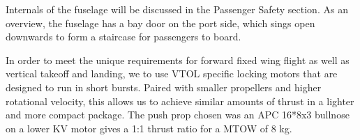 Internals of the fuselage will be discussed in the Passenger Safety section. As
an overview, the fuselage has a bay door on the port side, which sings open
downwards to form a staircase for passengers to board.

In order to meet the unique requirements for forward fixed wing flight as well
as vertical takeoff and landing, we to use VTOL specific locking motors that
are designed to run in short bursts. Paired with smaller propellers and higher
rotational velocity, this allows us to achieve similar amounts of thrust in a
lighter and more compact package. The push prop chosen was an APC 16*8x3
bullnose on a lower KV motor gives a 1:1 thrust ratio for a MTOW of 8 kg.
